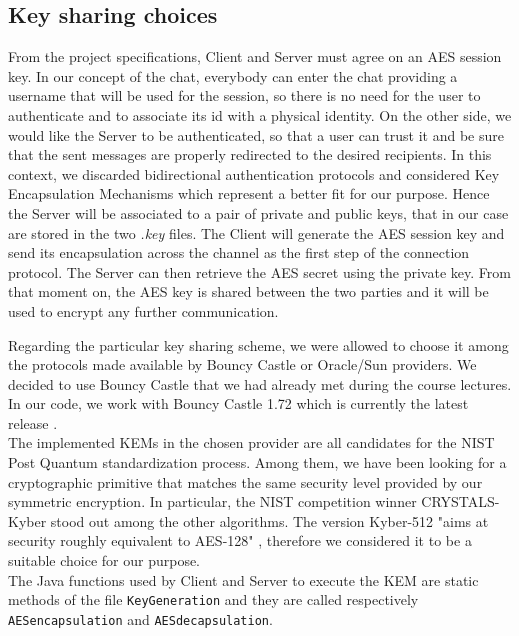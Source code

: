 \documentclass[12pt]{article}
\begin{document}
\subsection*{Key sharing choices}
From the project specifications, Client and Server must agree on an AES session key. In our concept of the chat, everybody can enter the chat providing a username that will be used for the session, so there is no need for the user to authenticate and to associate its id with a physical identity. On the other side, we would like the Server to be authenticated, so that a user can trust it and be sure that the sent messages are properly redirected to the desired recipients. In this context, we discarded bidirectional authentication protocols and considered Key Encapsulation Mechanisms which represent a better fit for our purpose. Hence the Server will be associated to a pair of private and public keys, that in our case are stored in the two {\em .key} files. The Client will generate the AES session key and send its encapsulation across the channel as the first step of the connection protocol. The Server can then retrieve the AES secret using the private key. From that moment on, the AES key is shared between the two parties and it will be used to encrypt any further communication.

\noindent Regarding the particular key sharing scheme, we were allowed to choose it among the protocols made available by Bouncy Castle or Oracle/Sun providers. We decided to use Bouncy Castle that we had already met during the course lectures. In our code, we work with Bouncy Castle 1.72 which is currently the latest release \cite{bouncy}. 
\\The implemented KEMs in the chosen provider are all candidates for the NIST Post Quantum standardization process. Among them, we have been looking for a cryptographic primitive that matches the same security level provided by our symmetric encryption. In particular, the NIST competition winner CRYSTALS-Kyber stood out among the other algorithms. The version Kyber-512 "aims at security roughly equivalent to AES-128" \cite{kyber}, therefore we considered it to be a suitable choice for our purpose.\\
The Java functions used by Client and Server to execute the KEM are static methods of the file \texttt{KeyGeneration} and they are called respectively \texttt{AESencapsulation} and \texttt{AESdecapsulation}.
\end{document}
